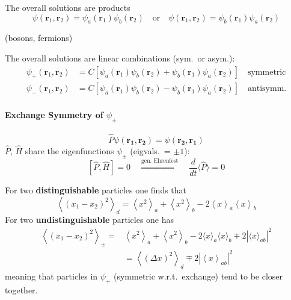 The overall solutions are products
\begin{equation*}
    \psi(\mathbf{r}_{1},\mathbf{r}_{2} )=\psi_{a}(\mathbf{r}_{1})\psi_{b}(\mathbf{r}_{2}) \quad\text{or}\quad
    \psi(\mathbf{r}_{1},\mathbf{r}_{2}) =\psi_{b}(\mathbf{r}_{1})\psi_{a}(\mathbf{r}_{2})
\end{equation*}

\newpar{}
 (bosons, fermions)

The overall solutions are linear combinations (sym.\ or asym.):
\begin{align*}
    \psi_{+}(\mathbf{r}_{1},\mathbf{r}_{2}) & =C\left[\psi_{a}(\mathbf{r}_{1})\psi_{b}(\mathbf{r}_{2})+\psi_{b}(\mathbf{r}_{1})\psi_{a}(\mathbf{r}_{2})\right]\quad \mathrm{symmetric} \\
    \psi_{-}(\mathbf{r}_{1},\mathbf{r}_{2}) & =C\left[\psi_{a}(\mathbf{r}_{1})\psi_{b}(\mathbf{r}_{2})-\psi_{b}(\mathbf{r}_{1})\psi_{a}(\mathbf{r}_{2})\right]\quad \mathrm{antisymm.}
\end{align*}

\paragraph[Exchange Symmetry]{Exchange Symmetry of $\psi_\pm$}

\begin{equation*}
    \widehat{P}\psi(\mathbf{r_1},\mathbf{r_2})=\psi(\mathbf{r_2},\mathbf{r_1})
\end{equation*}
$\widehat{P}$, $\widehat{H}$ share the eigenfunctions $\psi_{\pm}$ (eigvals.\ = $\pm 1$):
\begin{equation*}
    \left[\widehat{P},\widehat{H}\right]=0 \quad \overset{\text{gen. Ehrenfest}}{\Rightarrow} \quad
    \frac{d}{dt}\langle\widehat{P}\rangle=0
\end{equation*}

For two \textbf{distinguishable} particles one finds that
\begin{equation*}
    \left\langle{\left(x_{1}-x_{2}\right)}^{2}\right\rangle_{d}=\left\langle x^{2}\right\rangle_{a}+\left\langle x^{2}\right\rangle_{b}-2\left\langle x\right\rangle_{a}\left\langle x\right\rangle_{b}
\end{equation*}
For two \textbf{undistinguishable} particles one has
\begin{align*}
    \left\langle{\left(x_{1}-x_{2}\right)}^{2}\right\rangle_{\pm}= & \left\langle x^{2}\right\rangle_{a}+\left\langle x^{2}\right\rangle_{b}-2\langle x\rangle_{a}\langle x\rangle_{b}\mp2|\langle x\rangle_{ab}|^{2} \\
                                                                   & =\left\langle{\left(\Delta x\right)}^{2}\right\rangle_{d}\mp2\left|\left\langle x\right\rangle_{ab}\right|^{2}
\end{align*}
meaning that particles in $\psi_{+}$ (symmetric w.r.t.\ exchange) tend to be closer together.

